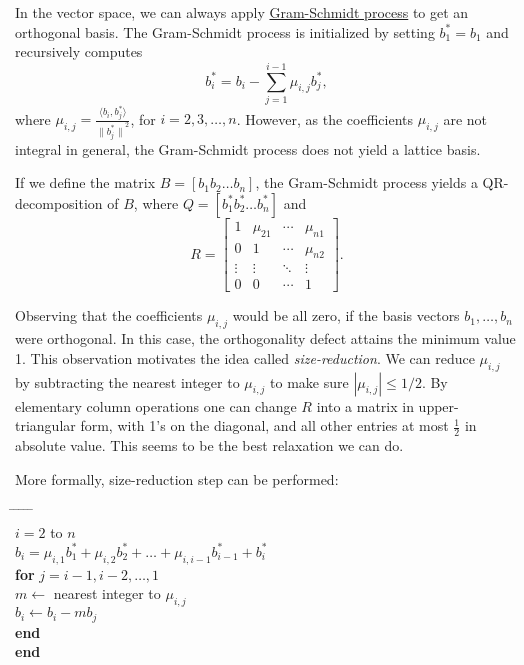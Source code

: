 \documentclass[twoside]{article}
\newcommand{\ip}[2]{\langle {#1}, {#2} \rangle}
\begin{document}
In the vector space, we can always apply \underline{Gram-Schmidt process} to get an orthogonal basis. The Gram-Schmidt process is initialized by setting $b_1^\ast=b_1$ and recursively computes
$$b_i^\ast=b_i-\sum_{j=1}^{i-1}\mu_{i,j}b_j^\ast,$$
where $\mu_{i,j}=\frac{\ip{b_i}{b_j^\ast}}{{\lVert b_j^\ast\rVert}^2}$, for $i=2,3,\dots,n$. However, as the coefficients $\mu_{i,j}$ are not integral in general, the Gram-Schmidt process does not yield a lattice basis.

If we define the matrix $B=[b_1 b_2\dots b_n]$, the Gram-Schmidt process yields a QR-decomposition of $B$, where
$Q=[b_1^\ast b_2^\ast \dots b_n^\ast]$ and
$$R=
\begin{bmatrix}
1 & \mu_{21} & \cdots & \mu_{n1}\\
0 &  1 & \cdots  & \mu_{n2}\\
\vdots & \vdots & \ddots & \vdots\\
0 & 0 & \cdots & 1
\end{bmatrix}.$$


Observing that the coefficients $\mu_{i,j}$ would be all zero, if the basis vectors $b_1,\dots,b_n$ were orthogonal. In this case, the orthogonality defect attains the minimum value 1. This observation motivates the idea called \emph{size-reduction}. We can reduce $\mu_{i,j}$ by subtracting the nearest integer to $\mu_{i,j}$ to make sure $|\mu_{i,j}|\leq 1/2$. By elementary column operations one can change $R$ into a matrix in upper-triangular form, with 1's on the diagonal, and all other entries at most $\frac{1}{2}$ in absolute value. This seems to be the best relaxation we can do.

More formally, size-reduction step can be performed:
\begin{tabbing}
\hspace*{.25in} \= \hspace*{.25in} \= \hspace*{.25in} \= \hspace*{.25in} \= \hspace*{.25in} \=\kill
{}\\
 $i=2$ to $n$ \\
\>\> $b_i=\mu_{i,1}b_1^\ast+\mu_{i,2}b_2^\ast+\dots+\mu_{i,i-1}b_{i-1}^\ast+b_i^\ast$\\
\>\> {\bf for} $j=i-1,i-2,\dots,1$ \\
\>\>\> $m \leftarrow $ nearest integer to $\mu_{i,j}$\\
\>\>\> $b_i \leftarrow b_i-mb_j$\\
\>\> {\bf end} \\
\> {\bf end} 
\end{tabbing}
\end{document}
